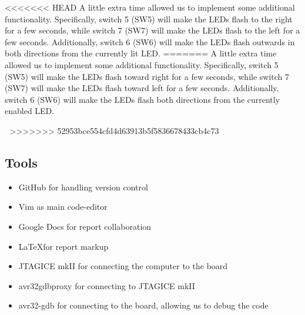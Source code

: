 <<<<<<< HEAD
A little extra time allowed us to implement some additional functionality. Specifically, switch 5 (SW5) will make the LEDs flash to the right for a few seconds, while switch 7 (SW7) will make the LEDs flash to the left for a few seconds. Additionally, switch 6 (SW6) will make the LEDs flash outwards in both directions from the currently lit LED.
=======
A little extra time allowed us to implement some additional functionality. Specifically, switch 5 (SW5) will make the LEDs flash toward right for a few seconds, while switch 7 (SW7) will make the LEDs flash toward left for a few seconds. Additionally, switch 6 (SW6) will make the LEDs flash both directions from the currently enabled LED.


>>>>>>> 52953bce554cfd4d63913b5f5836678433cb4c73

\subsection{Tools}


\begin{itemize}
\item GitHub for handling version control
\item Vim as main code-editor
\item Google Docs for report collaboration
\item \LaTeX for report markup
\item JTAGICE mkII for connecting the computer to the board
\item avr32gdbproxy for connecting to JTAGICE mkII
\item avr32-gdb for connecting to the board, allowing us to debug the code
\end{itemize}


